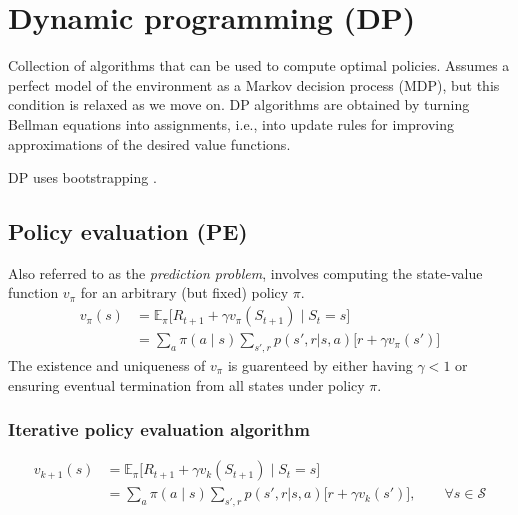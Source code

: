 \section{Dynamic programming (DP)}

Collection of algorithms that can be used to compute optimal policies.
Assumes a perfect model of the environment as a Markov decision process (MDP), but this condition is relaxed as we move on.
DP algorithms are obtained by turning Bellman equations into assignments, i.e., into update rules for improving approximations of the desired value functions.

DP uses bootstrapping .

\subsection{Policy evaluation (PE)}\label{sec:policy-evaluation}

Also referred to as the \textit{prediction problem}, involves computing the state-value function \( v_\pi \) for an arbitrary (but fixed) policy \( \pi \).
\begin{equation}
    \begin{aligned}
        v_\pi(s)
         & =
        \mathbb{E}_{\pi} \big[ R_{t+1} + \gamma v_\pi(S_{t+1}) \;\big|\; S_t = s \big]
        \\ & =
        \sum_{a} \pi(a \mid s) \sum_{s', r} p(s', r | s, a) \Big[ r + \gamma v_\pi(s') \Big]
    \end{aligned}
\end{equation}
The existence and uniqueness of \( v_\pi \) is guarenteed by either having \( \gamma < 1 \) or ensuring eventual termination from all states under policy \( \pi \).

\subsubsection{Iterative policy evaluation algorithm}\label{sec:iterative-policy-evaluation}

\begin{equation}
    \begin{aligned}
        v_{k+1}(s)
         & =
        \mathbb{E}_{\pi} \big[ R_{t+1} + \gamma v_k(S_{t+1}) \;\big|\; S_t = s \big]
        \\ & =
        \sum_{a} \pi(a \mid s) \sum_{s', r} p(s', r | s, a) \Big[ r + \gamma v_k(s') \Big]
        , \qquad \forall s \in \mathcal{S}
    \end{aligned}
\end{equation}

